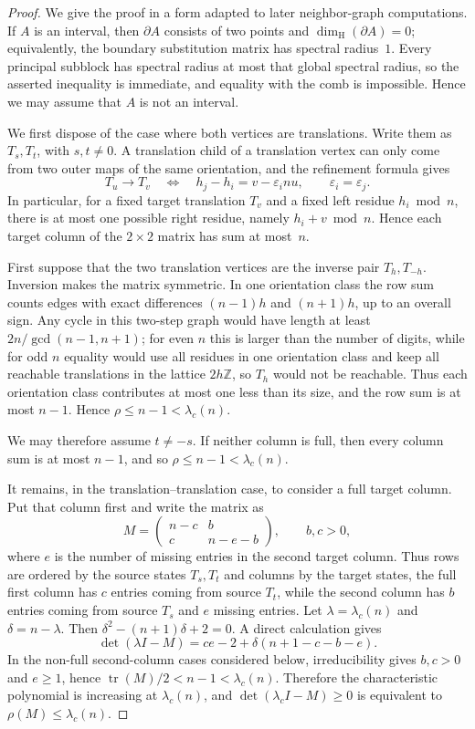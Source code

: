 \documentclass{amsart}
\theoremstyle{definition}
\theoremstyle{remark}
\newcommand{\Z}{\mathbb{Z}}
\newcommand{\dH}{\dim_{\mathrm{H}}}
\begin{document}
\begin{proof}
We give the proof in a form adapted to later neighbor-graph
computations.  If \(A\) is an interval, then \(\partial A\) consists of
two points and \(\dH(\partial A)=0\); equivalently, the boundary
substitution matrix has spectral radius~\(1\).  Every principal subblock
has spectral radius at most that global spectral radius, so the asserted
inequality is immediate, and equality with the comb is
impossible.  Hence we may assume that \(A\) is not an interval.

We first dispose
of the case where both vertices are translations.  Write them as
\(T_s,T_t\), with \(s,t\ne0\).  A translation child of a translation
vertex can only come from two outer maps of the same orientation, and
the refinement formula gives
\[
  T_u \longrightarrow T_v
  \quad\Longleftrightarrow\quad
  h_j-h_i=v-\varepsilon_i n u,
  \qquad \varepsilon_i=\varepsilon_j .
\]
In particular, for a fixed target translation \(T_v\) and a fixed left
residue \(h_i\bmod n\), there is at most one possible right residue,
namely \(h_i+v\bmod n\).  Hence each target column of the
\(2\times2\) matrix has sum at most~\(n\).

First suppose that the two translation vertices are the inverse pair
\(T_h,T_{-h}\).  Inversion makes the matrix symmetric.  In one orientation
class the row sum counts edges with exact differences \((n-1)h\) and
\((n+1)h\), up to an overall sign.  Any cycle in this two-step graph
would have length at least \(2n/\gcd(n-1,n+1)\); for even \(n\) this is
larger than the number of digits, while for odd \(n\) equality would use
all residues in one orientation class and keep all reachable translations
in the lattice \(2h\Z\), so \(T_h\) would not be reachable.  Thus each
orientation class contributes at most one less than its size, and the
row sum is at most \(n-1\).  Hence \(\rho\le n-1<\lambda_c(n)\).

We may therefore assume \(t\ne -s\).  If neither column is full,
then every column sum is at most \(n-1\), and so \(\rho\le n-1<
\lambda_c(n)\).

It remains, in the translation--translation case, to consider a full
target column.  Put that column first and write the matrix as
\[
  M=\begin{pmatrix}n-c&b\\ c&n-e-b\end{pmatrix},
  \qquad b,c>0,
\]
where \(e\) is the number of missing entries in the second target
column.  Thus rows are ordered by the source states \(T_s,T_t\) and
columns by the target states, the full first column has \(c\) entries
coming from source \(T_t\), while the second column has \(b\) entries
coming from source \(T_s\) and \(e\) missing entries.  Let
\(\lambda=\lambda_c(n)\) and \(\delta=n-\lambda\).  Then
\(\delta^2-(n+1)\delta+2=0\).  A direct calculation gives
\[
  \det(\lambda I-M)
  = ce-2+\delta(n+1-c-b-e).
\]
In the non-full second-column cases considered below, irreducibility
gives \(b,c>0\) and \(e\ge1\), hence
\(\operatorname{tr}(M)/2< n-1<\lambda_c(n)\).  Therefore the
characteristic polynomial is increasing at \(\lambda_c(n)\), and
\(\det(\lambda_c I-M)\ge0\) is equivalent to
\(\rho(M)\le\lambda_c(n)\).


\end{proof}
\end{document}
